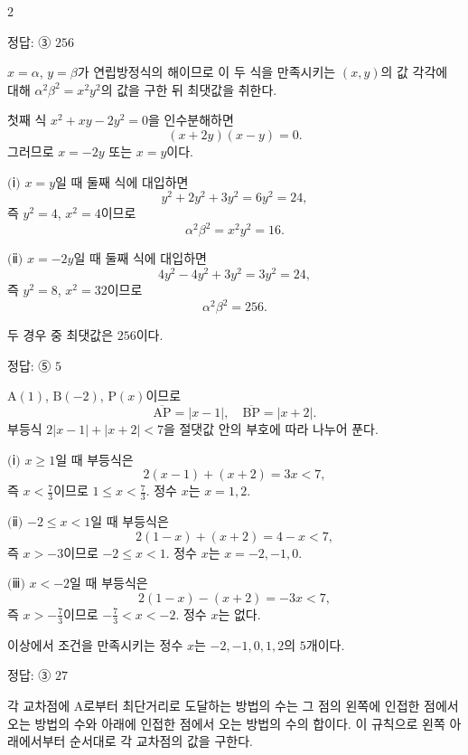 \documentclass[10pt]{article}
\begin{document}
\begin{multicols}{2}
\begin{answerbox}정답: ③ $256$\end{answerbox}

$x = \alpha$, $y = \beta$가 연립방정식의 해이므로 이 두 식을 만족시키는 $(x, y)$의 값 각각에 대해 $\alpha^2 \beta^2 = x^2 y^2$의 값을 구한 뒤 최댓값을 취한다.

첫째 식 $x^2 + xy - 2y^2 = 0$을 인수분해하면
\[ (x + 2y)(x - y) = 0. \]
그러므로 $x = -2y$ 또는 $x = y$이다.

$(\!$ⅰ$)$ $x = y$일 때 둘째 식에 대입하면
\[ y^2 + 2y^2 + 3y^2 = 6y^2 = 24, \]
즉 $y^2 = 4$, $x^2 = 4$이므로
\[ \alpha^2 \beta^2 = x^2 y^2 = 16. \]

$(\!$ⅱ$)$ $x = -2y$일 때 둘째 식에 대입하면
\[ 4y^2 - 4y^2 + 3y^2 = 3y^2 = 24, \]
즉 $y^2 = 8$, $x^2 = 32$이므로
\[ \alpha^2 \beta^2 = 256. \]

두 경우 중 최댓값은 $256$이다.

\begin{answerbox}정답: ⑤ $5$\end{answerbox}

$\mathrm{A}(1)$, $\mathrm{B}(-2)$, $\mathrm{P}(x)$이므로
\[ \overline{\mathrm{AP}} = |x - 1|,\quad \overline{\mathrm{BP}} = |x + 2|. \]
부등식 $2|x-1| + |x+2| < 7$을 절댓값 안의 부호에 따라 나누어 푼다.

$(\!$ⅰ$)$ $x \ge 1$일 때 부등식은
\[ 2(x-1) + (x+2) = 3x < 7, \]
즉 $x < \tfrac{7}{3}$이므로 $1 \le x < \tfrac{7}{3}$. 정수 $x$는 $x = 1, 2$.

$(\!$ⅱ$)$ $-2 \le x < 1$일 때 부등식은
\[ 2(1-x) + (x+2) = 4 - x < 7, \]
즉 $x > -3$이므로 $-2 \le x < 1$. 정수 $x$는 $x = -2, -1, 0$.

$(\!$ⅲ$)$ $x < -2$일 때 부등식은
\[ 2(1-x) - (x+2) = -3x < 7, \]
즉 $x > -\tfrac{7}{3}$이므로 $-\tfrac{7}{3} < x < -2$. 정수 $x$는 없다.

이상에서 조건을 만족시키는 정수 $x$는 $-2, -1, 0, 1, 2$의 $5$개이다.

\begin{answerbox}정답: ③ $27$\end{answerbox}

각 교차점에 $\mathrm{A}$로부터 최단거리로 도달하는 방법의 수는 그 점의 왼쪽에 인접한 점에서 오는 방법의 수와 아래에 인접한 점에서 오는 방법의 수의 합이다. 이 규칙으로 왼쪽 아래에서부터 순서대로 각 교차점의 값을 구한다.


\end{multicols}
\end{document}
